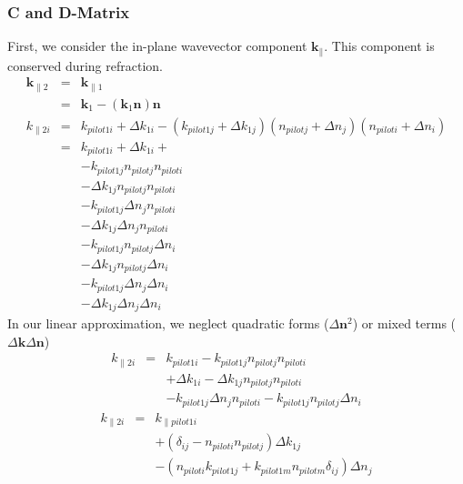 \documentclass[12pt,a4paper,twoside,openright,BCOR10mm,headsepline,titlepage,abstracton,chapterprefix,final]{scrreprt}
\newcommand\Vector[1]{{\mathbf{#1}}}
\newcommand\wavenumber{k}
\newcommand\Wavevector{\Vector{\wavenumber}}
\begin{document}
\subsubsection{C and D-Matrix}
First, we consider the in-plane wavevector component $\Wavevector_\parallel$.
This component is conserved during refraction.
\begin{eqnarray}
 \Wavevector_{\parallel2} 
 &=& \Wavevector_{\parallel1} \\
 &=& \Wavevector_1 - (\Wavevector_1 \Vector{n}) \Vector{n} \\
 \wavenumber_{\parallel2i}
 &=& \wavenumber_{pilot1i} + \Delta \wavenumber_{1i} - ( \wavenumber_{pilot1j} + \Delta \wavenumber_{1j} )( n_{pilotj} + \Delta n_j )( n_{piloti} + \Delta n_i )
 \\
 &=& \wavenumber_{pilot1i} + \Delta \wavenumber_{1i} +\nonumber \\
 &&- \wavenumber_{pilot1j}   n_{pilotj} n_{piloti} \nonumber\\
 &&- \Delta \wavenumber_{1j} n_{pilotj} n_{piloti} \nonumber\\
 &&- \wavenumber_{pilot1j}   \Delta n_j n_{piloti} \nonumber\\
 &&- \Delta \wavenumber_{1j} \Delta n_j n_{piloti} \nonumber\\
 &&- \wavenumber_{pilot1j}   n_{pilotj} \Delta n_i \nonumber\\
 &&- \Delta \wavenumber_{1j} n_{pilotj} \Delta n_i \nonumber\\
 &&- \wavenumber_{pilot1j}   \Delta n_j \Delta n_i \nonumber\\
 &&- \Delta \wavenumber_{1j} \Delta n_j \Delta n_i
\end{eqnarray}
In our linear approximation, we neglect quadratic forms ($\Delta \Vector{n}^2$) or mixed terms ($\Delta \Wavevector \Delta \Vector{n}$)
\begin{eqnarray}
 \wavenumber_{\parallel2i}
 &=& 
 \wavenumber_{pilot1i} - \wavenumber_{pilot1j}   n_{pilotj} n_{piloti} \nonumber\\
 &&+ \Delta \wavenumber_{1i} 
   - \Delta \wavenumber_{1j} n_{pilotj} n_{piloti} \nonumber\\
 &&- \wavenumber_{pilot1j}   \Delta n_j n_{piloti}
   - \wavenumber_{pilot1j}   n_{pilotj} \Delta n_i
\end{eqnarray}
\begin{eqnarray}
 \wavenumber_{\parallel2i}
 &=& 
 \wavenumber_{\parallel pilot1i} \nonumber\\
 &&+ ( \delta_{ij} -  n_{piloti} n_{pilotj} ) \Delta \wavenumber_{1j} \nonumber\\
 &&- ( n_{piloti} \wavenumber_{pilot1j} + \wavenumber_{pilot1m}   n_{pilotm} \delta_{ij}) \Delta n_j
\end{eqnarray}
\end{document}
